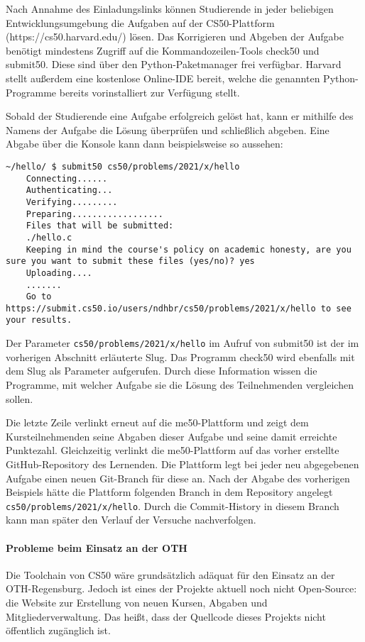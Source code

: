 Nach Annahme des Einladungslinks können Studierende in jeder beliebigen
Entwicklungsumgebung die Aufgaben auf der CS50-Plattform
(https://cs50.harvard.edu/) lösen. Das Korrigieren und Abgeben der Aufgabe
benötigt mindestens Zugriff auf die Kommandozeilen-Tools check50 und submit50.
Diese sind über den Python-Paketmanager frei verfügbar. Harvard stellt außerdem
eine kostenlose Online-IDE bereit, welche die genannten Python-Programme bereits
vorinstalliert zur Verfügung stellt.

Sobald der Studierende eine Aufgabe erfolgreich gelöst hat, kann er mithilfe des
Namens der Aufgabe die Lösung überprüfen und schließlich abgeben. Eine Abgabe
über die Konsole kann dann beispielsweise so aussehen:

\begin{lstlisting}[style=Bash]
    ~/hello/ $ submit50 cs50/problems/2021/x/hello
    Connecting......
    Authenticating...
    Verifying.........
    Preparing..................
    Files that will be submitted:
    ./hello.c
    Keeping in mind the course's policy on academic honesty, are you sure you want to submit these files (yes/no)? yes
    Uploading....
    .......
    Go to https://submit.cs50.io/users/ndhbr/cs50/problems/2021/x/hello to see your results.
\end{lstlisting}

Der Parameter \texttt{cs50/problems/2021/x/hello} im Aufruf von submit50 ist
der im vorherigen Abschnitt erläuterte Slug. Das Programm check50 wird ebenfalls
mit dem Slug als Parameter aufgerufen. Durch diese Information wissen die
Programme, mit welcher Aufgabe sie die Lösung des Teilnehmenden vergleichen
sollen.

Die letzte Zeile verlinkt erneut auf die me50-Plattform und zeigt dem
Kursteilnehmenden seine Abgaben dieser Aufgabe und seine damit erreichte
Punktezahl. Gleichzeitig verlinkt die me50-Plattform auf das vorher erstellte
GitHub-Repository des Lernenden. Die Plattform legt bei jeder neu abgegebenen
Aufgabe einen neuen Git-Branch für diese an. Nach der Abgabe des vorherigen
Beispiels hätte die Plattform folgenden Branch in dem Repository angelegt
\texttt{cs50/problems/2021/x/hello}. Durch die Commit-History in diesem Branch 
kann man später den Verlauf der Versuche nachverfolgen.

\paragraph{Probleme beim Einsatz an der OTH}
Die Toolchain von CS50 wäre grundsätzlich adäquat für den Einsatz an der
OTH-Regensburg. Jedoch ist eines der Projekte aktuell noch nicht Open-Source:
die Website zur Erstellung von neuen Kursen, Abgaben und Mitgliederverwaltung. 
Das heißt, dass der Quellcode dieses Projekts nicht öffentlich zugänglich ist.

